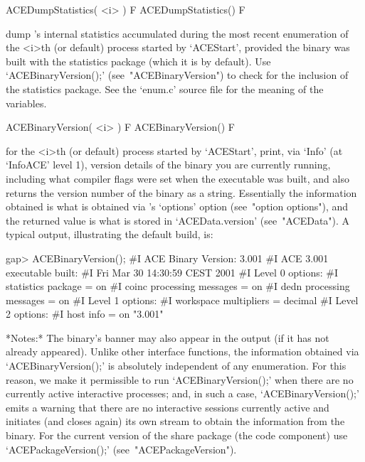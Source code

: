 \>ACEDumpStatistics( <i> ) F
\>ACEDumpStatistics() F

dump {\ACE}'s internal statistics accumulated during the  most  recent
enumeration of the <i>th (or default) process started  by  `ACEStart',
provided the {\ACE} binary  was  built  with  the  statistics  package
(which    it    is    by    default).    Use     `ACEBinaryVersion();'
(see~"ACEBinaryVersion") to check for the inclusion of the  statistics
package.  See  the  `enum.c'  source  file  for  the  meaning  of  the
variables.

\>ACEBinaryVersion( <i> ) F
\>ACEBinaryVersion() F

for the <i>th (or default) process started by `ACEStart',  print,  via
`Info' (at `InfoACE' level 1), version details of  the  {\ACE}  binary
you are currently running, including what compiler flags were set when
the executable was built, and also returns the version number  of  the
binary as a string. Essentially the information obtained  is  what  is
obtained via {\ACE}'s `options' option (see~"option options"), and the
returned value is what is stored in `ACEData.version' (see~"ACEData").
A typical output, illustrating the default build, is:

\beginexample
gap> ACEBinaryVersion();
#I  ACE Binary Version: 3.001
#I  ACE 3.001 executable built:
#I    Fri Mar 30 14:30:59 CEST 2001
#I  Level 0 options:
#I    statistics package = on
#I    coinc processing messages = on
#I    dedn processing messages = on
#I  Level 1 options:
#I    workspace multipliers = decimal
#I  Level 2 options:
#I    host info = on
"3.001"
\endexample

*Notes:*
The {\ACE} binary's banner may also appear in the output  (if  it  has
not already appeared). Unlike other {\ACE}  interface  functions,  the
information   obtained   via   `ACEBinaryVersion();'   is   absolutely
independent  of  any  enumeration.  For  this  reason,  we   make   it
permissible to run `ACEBinaryVersion();' when there are  no  currently
active  interactive  {\ACE}  processes;   and,   in   such   a   case,
`ACEBinaryVersion();' emits a warning that there  are  no  interactive
{\ACE} sessions currently active and initiates (and closes again)  its
own stream to obtain the information from the {\ACE} binary.  For  the
current  version  of  the  {\ACE}  share  package  (the  {\GAP}   code
component) use `ACEPackageVersion();' (see~"ACEPackageVersion").


